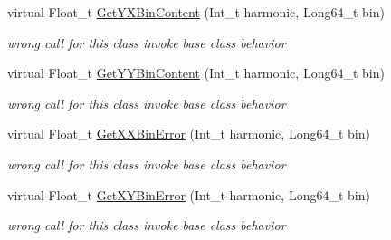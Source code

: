 \begin{DoxyCompactItemize}
virtual Float\+\_\+t \mbox{\hyperlink{classQn_1_1CorrectionProfileCorrelationComponents_a81c1b7bd19dca53c3e1e9407daffc1e6}{Get\+Y\+X\+Bin\+Content}} (Int\+\_\+t harmonic, Long64\+\_\+t bin)
\begin{DoxyCompactList}\small\item\em wrong call for this class invoke base class behavior \end{DoxyCompactList}\item 
\mbox{\label{classQn_1_1CorrectionProfileCorrelationComponents_ae409fa99ff155d6a356af6f5901e2360}} 
virtual Float\+\_\+t \mbox{\hyperlink{classQn_1_1CorrectionProfileCorrelationComponents_ae409fa99ff155d6a356af6f5901e2360}{Get\+Y\+Y\+Bin\+Content}} (Int\+\_\+t harmonic, Long64\+\_\+t bin)
\begin{DoxyCompactList}\small\item\em wrong call for this class invoke base class behavior \end{DoxyCompactList}\item 
\mbox{\label{classQn_1_1CorrectionProfileCorrelationComponents_af27e27f474d058efe4495a90c7fa73c1}} 
virtual Float\+\_\+t \mbox{\hyperlink{classQn_1_1CorrectionProfileCorrelationComponents_af27e27f474d058efe4495a90c7fa73c1}{Get\+X\+X\+Bin\+Error}} (Int\+\_\+t harmonic, Long64\+\_\+t bin)
\begin{DoxyCompactList}\small\item\em wrong call for this class invoke base class behavior \end{DoxyCompactList}\item 
\mbox{\label{classQn_1_1CorrectionProfileCorrelationComponents_a1d3376133250c6af3e93441d19aebc1b}} 
virtual Float\+\_\+t \mbox{\hyperlink{classQn_1_1CorrectionProfileCorrelationComponents_a1d3376133250c6af3e93441d19aebc1b}{Get\+X\+Y\+Bin\+Error}} (Int\+\_\+t harmonic, Long64\+\_\+t bin)
\begin{DoxyCompactList}\small\item\em wrong call for this class invoke base class behavior \end{DoxyCompactList}\item 
\mbox{\label{classQn_1_1CorrectionProfileCorrelationComponents_aa5af19d9bf922e6be18b0f5a651a8c45}} 

\end{DoxyCompactItemize}

